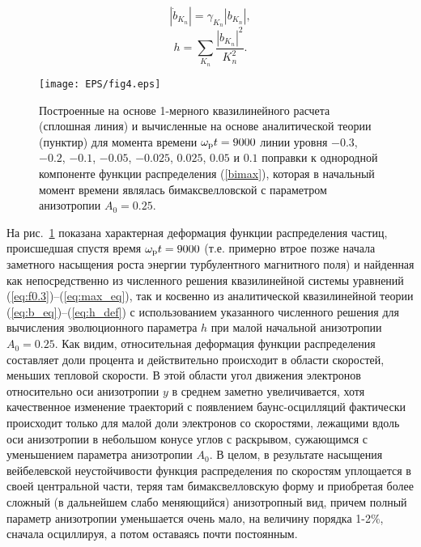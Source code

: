 \begin{equation}
\label{eq:b_eq}
|\dot b_{K_n}|=\gamma_{K_n}|b_{K_n}|, 
\end{equation}
\begin{equation}
\label{eq:h_def}
h=\sum_{K_n}\dfrac{|b_{K_n}|^2}{K_n^2}.
\end{equation}
\begin{figure}[b]
\texttt{[image: EPS/fig4.eps]}
\centering
\caption{Построенные на основе 1-мерного квазилинейного расчета (сплошная линия) и вычисленные на основе аналитической теории~\cite{Pokhotelov2011} (пунктир) для момента времени $\omega_\mathrm{p} t = 9000$ линии уровня $-0.3$, $-0.2$, $-0.1$, $-0.05$, $-0.025$, $0.025$, $0.05$ и $0.1$ поправки к однородной компоненте функции распределения (\ref{bimax}), которая в начальный момент времени являлась бимаксвелловской с параметром анизотропии $A_0=0.25$. }
\label{fig:sravnenie_FR1d}
\end{figure}
На рис.~\ref{fig:sravnenie_FR1d} показана характерная деформация функции распределения частиц, происшедшая спустя время $\omega_\mathrm{p} t = 9000$ (т.е. примерно втрое позже начала заметного насыщения роста энергии турбулентного магнитного поля) и найденная как непосредственно из численного решения квазилинейной системы уравнений (\ref{eq:f0.3})--(\ref{eq:max_eq}), так и косвенно из аналитической квазилинейной теории (\ref{eq:b_eq})--(\ref{eq:h_def}) с использованием указанного численного решения для вычисления эволюционного параметра $h$ при малой начальной анизотропии $A_0=0.25$. Как видим, относительная деформация функции распределения составляет доли процента и действительно происходит в области скоростей, меньших тепловой скорости. В этой области угол движения электронов относительно оси анизотропии $y$ в среднем заметно увеличивается, хотя качественное изменение траекторий с появлением баунс-осцилляций фактически происходит только для малой доли электронов со скоростями, лежащими вдоль оси анизотропии в небольшом конусе углов с раскрывом, сужающимся с уменьшением параметра анизотропии $A_0$. В целом, в результате насыщения вейбелевской неустойчивости функция распределения по скоростям уплощается в своей центральной части, теряя там бимаксвелловскую форму и приобретая более сложный (в дальнейшем слабо меняющийся) анизотропный вид, причем полный параметр анизотропии уменьшается очень мало, на величину порядка 1-2\%, сначала осциллируя, а потом оставаясь почти постоянным. 



